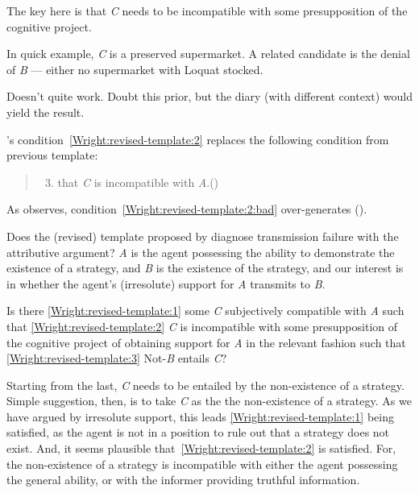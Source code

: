 \documentclass[10pt]{article}
\begin{document}
\begin{note}
  The key here is that \emph{C} needs to be incompatible with some presupposition of the cognitive project.

  In quick example, \emph{C} is a preserved supermarket.
  A related candidate is the denial of \emph{B} --- either no supermarket with Loquat stocked.

  Doesn't quite work.
  Doubt this prior, but the diary (with different context) would yield the result.

  \citeauthor{Wright:2011wn}'s condition~\ref{Wright:revised-template:2} replaces the following condition from previous template:
  \begin{quote}
    \begin{enumerate}[label=(\roman*\(^{-}\)), ref=(\roman*\(^{-}\))]
      \setcounter{enumi}{2}
    \item\label{Wright:revised-template:2:bad} that \emph{C} is incompatible with \emph{A}.\hfill\mbox{(\citeyear[88]{Wright:2011wn})}
    \end{enumerate}
  \end{quote}
  As \citeauthor{Wright:2011wn} observes, condition~\ref{Wright:revised-template:2:bad} over-generates (\citeyear[90--92]{Wright:2011wn}).
\end{note}


\begin{note}
  Does the (revised) template proposed by \citeauthor{Wright:2011wn} diagnose transmission failure with the attributive argument?
  \emph{A} is the agent possessing the ability to demonstrate the existence of a strategy, and \emph{B} is the existence of the strategy, and our interest is in whether the agent's (irresolute) support for \emph{A} transmits to \emph{B}.

  Is there \ref{Wright:revised-template:1} some \emph{C} subjectively compatible with \emph{A}  such that \ref{Wright:revised-template:2} \emph{C} is incompatible with some presupposition of the cognitive project of obtaining support for \emph{A} in the relevant fashion  such that \ref{Wright:revised-template:3} Not-\emph{B} entails \emph{C}?

  Starting from the last, \emph{C} needs to be entailed by the non-existence of a strategy.
  Simple suggestion, then, is to take \emph{C} as the the non-existence of a strategy.
  As we have argued by irresolute support, this leads \ref{Wright:revised-template:1} being satisfied, as the agent is not in a position to rule out that a strategy does not exist.
  And, it seems plausible that~\ref{Wright:revised-template:2} is satisfied.
  For, the non-existence of a strategy is incompatible with either the agent possessing the general ability, or with the informer providing truthful information.
\end{note}
\end{document}
